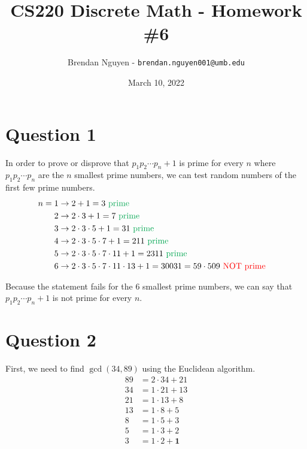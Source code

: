 \documentclass[letterpaper, 12pt]{article}
\title{CS220 Discrete Math - Homework \#6}
\author{Brendan Nguyen - \texttt{brendan.nguyen001@umb.edu}}
\date{March 10, 2022}
\begin{document}
\maketitle

\section*{Question 1}
In order to prove or disprove that $p_{1}p_{2} \cdots p_n + 1$ is prime for every $n$ where $p_{1}p_{2} \cdots p_n$ are the $n$ smallest prime numbers, we can test random numbers of the first few prime numbers.
\begin{align*}
    n = 1 &\to 2 + 1 = 3 \text{ \textcolor{Green}{prime}}&\\
    2 &\to 2 \cdot 3 + 1 = 7 \text{ \textcolor{Green}{prime}}&\\
    3 &\to 2 \cdot 3 \cdot 5 + 1 = 31 \text{ \textcolor{Green}{prime}}&\\
    4 &\to 2 \cdot 3 \cdot 5 \cdot 7 + 1 = 211 \text{ \textcolor{Green}{prime}}&\\
    5 &\to 2 \cdot 3 \cdot 5 \cdot 7 \cdot 11 + 1 = 2311 \text{ \textcolor{Green}{prime}}&\\
    6 &\to 2 \cdot 3 \cdot 5 \cdot 7 \cdot 11 \cdot 13 + 1 = 30031 = 59 \cdot 509 \text{ \textcolor{red}{NOT prime}}
\end{align*}

Because the statement fails for the 6 smallest prime numbers, we can say that $p_{1}p_{2} \cdots p_n + 1$ is not prime for every $n$.

\section*{Question 2}
First, we need to find $\gcd(34, 89)$ using the Euclidean algorithm.
\begin{align*}
    89 &= 2 \cdot 34 + 21\\
    34 &= 1 \cdot 21 + 13\\
    21 &= 1 \cdot 13 + 8\\
    13 &= 1 \cdot 8 + 5\\
    8 &= 1 \cdot 5 + 3\\
    5 &= 1 \cdot 3 + 2\\
    3 &= 1 \cdot 2 + \boxed{\mathbf{1}}
\end{align*}
\end{document}
